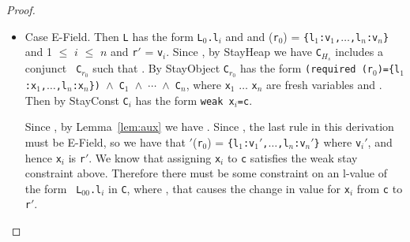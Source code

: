 \begin{proof}
\begin{itemize}
\begin{itemize}
\begin{itemize}
Since
, the last rule in this derivation
must be {\sc E-Variable}, so we have \Euid$'$({\tt x}) = {\tt r$'$}.  
We know that assigning {\tt x} to {\tt c} satisfies the weak stay
constraint above.
Therefore there must be some constraint on {\tt x} in {\tt C}
that causes the change in value for {\tt x} from {\tt c} to {\tt
  r$'$}.  
  \item Case {\sc E-Field}.  Then {\tt L} has the form  {\tt L$_0$.l$_i$}
  and  and
  \texttt{\Huid}(\texttt{r$_0$}) =
  \texttt{\{l$_1$:v$_1$,$\ldots$,l$_n$:v$_n$\}} and
  1 $\leq$ $i$ $\leq$ $n$ and {\tt r$'$} = {\tt v$_i$}. 
 Since , by
  {\sc StayHeap} we have {\tt C$_{H_s}$} includes a conjunct {\tt
    C$_{r_0}$} such that .
By {\sc StayObject} {\tt C$_{r_0}$} has the form {\tt (required \Deref(r$_0$)=\{l$_1$:x$_1$,$\ldots$,l$_n$:x$_n$\}) $\wedge$
    C$_{1}$ $\wedge$
    $\cdots$ $\wedge$
    C$_{n}$}, where {\tt x$_1$} $\ldots$ {\tt x$_n$} are fresh
  variables and .  Then by {\sc
    StayConst}
{\tt C$_i$} has the form {\tt weak x$_i$=c}.  

Since , by
  Lemma~\ref{lem:aux} we have .
Since
, the last rule in this derivation
must be {\sc E-Field}, so we have that \Huid$'$({\tt r$_0$}) =
\texttt{\{l$_1$:v$_1'$,$\ldots$,l$_n$:v$_n'$\}}  where {\tt v$_i'$}, and
hence {\tt x$_i$} is
{\tt r$'$}.
We know that assigning {\tt x$_i$} to {\tt c} satisfies the weak stay
constraint above.
Therefore there must be some constraint on an l-value of the form {\tt
  L$_{00}$.l$_i$} in {\tt C}, where ,
that causes the change in value for {\tt x$_i$} from {\tt c} to {\tt
  r$'$}.  
\end{itemize}


\end{itemize}
\end{itemize}
\end{proof}
